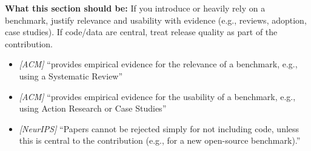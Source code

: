 \noindent\textbf{What this section should be:}
If you introduce or heavily rely on a benchmark, justify relevance and usability with evidence (e.g., reviews, adoption, case studies). If code/data are central, treat release quality as part of the contribution.
\begin{itemize}
  \item \textit{[ACM]} ``provides empirical evidence for the relevance of a benchmark, e.g., using a Systematic Review''
  \item \textit{[ACM]} ``provides empirical evidence for the usability of a benchmark, e.g., using Action Research or Case Studies''
  \item \textit{[NeurIPS]} ``Papers cannot be rejected simply for not including code, unless this is central to the contribution (e.g., for a new open-source benchmark).''
\end{itemize}